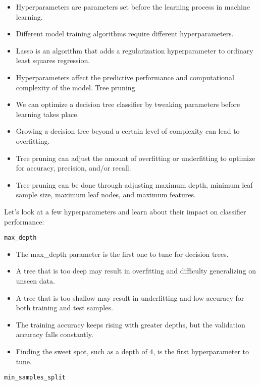 \documentclass[11pt]{article}
\providecommand{\tightlist}{%
      \setlength{\itemsep}{0pt}\setlength{\parskip}{0pt}}
\begin{document}
\begin{itemize}
\tightlist
\item
  Hyperparameters are parameters set before the learning process in
  machine learning.
\item
  Different model training algorithms require different hyperparameters.
\item
  Lasso is an algorithm that adds a regularization hyperparameter to
  ordinary least squares regression.
\item
  Hyperparameters affect the predictive performance and computational
  complexity of the model. Tree pruning
\item
  We can optimize a decision tree classifier by tweaking parameters
  before learning takes place.
\item
  Growing a decision tree beyond a certain level of complexity can lead
  to overfitting.
\item
  Tree pruning can adjust the amount of overfitting or underfitting to
  optimize for accuracy, precision, and/or recall.
\item
  Tree pruning can be done through adjusting maximum depth, minimum leaf
  sample size, maximum leaf nodes, and maximum features.
\end{itemize}

Let's look at a few hyperparameters and learn about their impact on
classifier performance:

\texttt{max\_depth}

\begin{itemize}
\tightlist
\item
  The max\_depth parameter is the first one to tune for decision trees.
\item
  A tree that is too deep may result in overfitting and difficulty
  generalizing on unseen data.
\item
  A tree that is too shallow may result in underfitting and low accuracy
  for both training and test samples.
\item
  The training accuracy keeps rising with greater depths, but the
  validation accuracy falls constantly.
\item
  Finding the sweet spot, such as a depth of 4, is the first
  hyperparameter to tune.
\end{itemize}

\texttt{min\_samples\_split}
\end{document}
